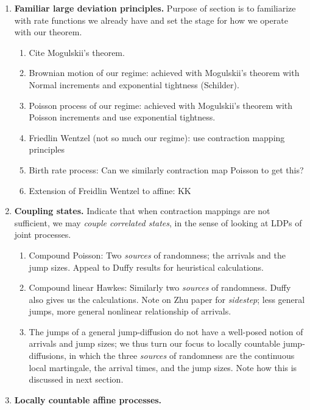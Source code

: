 

\begin{enumerate}
  \item
    {\bfseries Familiar large deviation principles.}
    Purpose of section is to familiarize with rate functions we already have and set the stage for how we operate with our theorem.
    \begin{enumerate}
      \item
        Cite Mogulskii's theorem.
      \item
        Brownian motion of our regime: achieved with Mogulskii's theorem with Normal increments and exponential tightness (Schilder).
      \item
        Poisson process of our regime: achieved with Mogulskii's theorem with Poisson increments and use exponential tightness.
      \item
        Friedlin Wentzel (not so much our regime): use contraction mapping principles
      \item
        Birth rate process: Can we similarly contraction map Poisson to get this?
      \item
        Extension of Freidlin Wentzel to affine: KK
    \end{enumerate}
  \item
    {\bfseries Coupling states.}
    Indicate that when contraction mappings are not sufficient, we may \emph{couple correlated states}, in the sense of looking at LDPs of joint processes.
    \begin{enumerate}
      \item
        Compound Poisson: Two \emph{sources} of randomness; the arrivals and the jump sizes. Appeal to Duffy results for heuristical calculations.
      \item
        Compound linear Hawkes: Similarly two \emph{sources} of randomness. Duffy also gives us the calculations.
        Note on Zhu paper for \emph{sidestep}; less general jumps, more general nonlinear relationship of arrivals.
      \item
        The jumps of a general jump-diffusion do not have a well-posed notion of arrivals and jump sizes; we thus turn our focus to locally countable jump-diffusions, in which the three \emph{sources} of randomness are the continuous local martingale, the arrival times, and the jump sizes.
        Note how this is discussed in next section.
    \end{enumerate}
  \item
    {\bfseries Locally countable affine processes.}

\end{enumerate}

